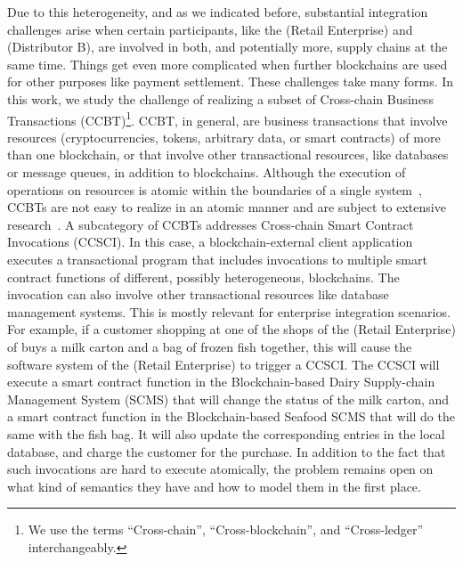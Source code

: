 \documentclass[review]{elsarticle}
\begin{document}
Due to this heterogeneity, and as we indicated before, substantial integration challenges arise when certain participants, like the (Retail Enterprise) and (Distributor B), are involved in both, and potentially more, supply chains at the same time.
Things get even more complicated when further blockchains are used for other purposes like payment settlement.
These challenges take many forms.
In this work, we study the challenge of realizing a subset of Cross-chain Business Transactions (CCBT)\footnote{We use the terms \enquote{Cross-chain}, \enquote{Cross-blockchain}, and \enquote{Cross-ledger} interchangeably.}.
CCBT, in general, are business transactions that involve resources (cryptocurrencies, tokens, arbitrary data, or smart contracts) of more than one blockchain, or that involve other transactional resources, like databases or message queues, in addition to blockchains.
Although the execution of operations on resources is atomic within the boundaries of a single system~\cite{Tai2017SALT}, CCBTs are not easy to realize in an atomic manner and are subject to extensive research~\cite{Qasse2019,Zakhary2019TransactionalSmartContracts,Siris2019,Zamyatin2019SoKCA,Borkowski2019}.
A subcategory of CCBTs addresses Cross-chain Smart Contract Invocations (CCSCI).
In this case, a blockchain-external client application executes a transactional program that includes invocations to multiple smart contract functions of different, possibly heterogeneous, blockchains.
The invocation can also involve other transactional resources like database management systems.
This is mostly relevant for enterprise integration scenarios.
For example, if a customer shopping at one of the shops of the (Retail Enterprise) of  buys a milk carton and a bag of frozen fish together, this will cause the software system of the (Retail Enterprise) to trigger a CCSCI.
The CCSCI will execute a smart contract function in the Blockchain-based Dairy Supply-chain Management System (SCMS) that will change the status of the milk carton, and a smart contract function in the Blockchain-based Seafood SCMS that will do the same with the fish bag.
It will also update the corresponding entries in the local database, and charge the customer for the purchase.
In addition to the fact that such invocations are hard to execute atomically, the problem remains open on what kind of semantics they have and how to model them in the first place.
\end{document}
